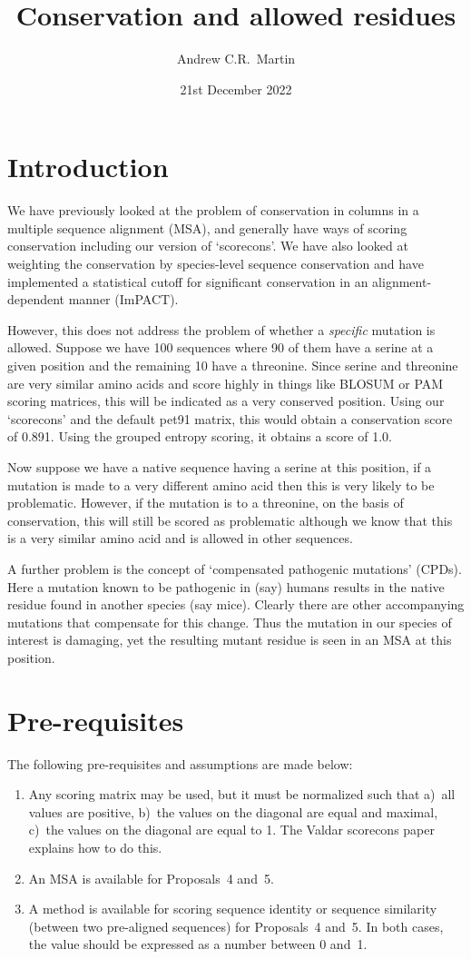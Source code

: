 \documentclass[a4paper]{article}
\title{Conservation and allowed residues}
\author{Andrew C.R.\ Martin}
\date{21st December 2022}
\begin{document}
\maketitle

\section{Introduction}
We have previously looked at the problem of conservation in columns in
a multiple sequence alignment (MSA), and generally have ways of
scoring conservation including our version of `scorecons'. We have
also looked at weighting the conservation by species-level sequence
conservation and have implemented a statistical cutoff for significant
conservation in an alignment-dependent manner (ImPACT).

However, this does not address the problem of whether a
\emph{specific} mutation is allowed. Suppose we have 100 sequences
where 90 of them have a serine at a given position and the remaining
10 have a threonine. Since serine and threonine are very similar amino
acids and score highly in things like BLOSUM or PAM scoring matrices,
this will be indicated as a very conserved position. Using our
`scorecons' and the default pet91 matrix, this would obtain a
conservation score of 0.891. Using the grouped entropy scoring, it
obtains a score of 1.0.

Now suppose we have a native sequence having a serine at this position,
if a mutation is made to a very different amino acid then this is very
likely to be problematic. However, if the mutation is to a threonine, on
the basis of conservation, this will still be scored as problematic
although we know that this is a very similar amino acid and is allowed
in other sequences.

A further problem is the concept of `compensated pathogenic mutations'
(CPDs). Here a mutation known to be pathogenic in (say) humans results
in the native residue found in another species (say mice). Clearly
there are other accompanying mutations that compensate for this
change. Thus the mutation in our species of interest is damaging, yet
the resulting mutant residue is seen in an MSA at this position.

\section{Pre-requisites}
The following pre-requisites and assumptions are made below:

\begin{enumerate}
  \item Any scoring matrix may be used, but it must be normalized such
    that a)~all values are positive, b)~the values on the diagonal are
    equal and maximal, c)~the values on the diagonal are equal to
    1. The Valdar scorecons paper explains how to do this.
  \item An MSA is available for Proposals~4 and~5.
  \item A method is available for scoring sequence identity or
    sequence similarity (between two pre-aligned sequences) for
    Proposals~4 and~5. In both cases, the value should be expressed as
    a number between 0 and~1.
\end{enumerate}
\end{document}

